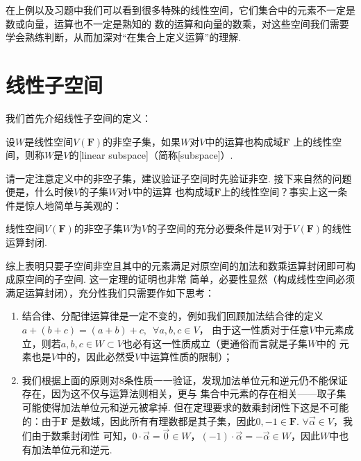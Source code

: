在上例以及习题中我们可以看到很多特殊的线性空间，它们集合中的元素不一定是数或向量，运算也不一定是熟知的
数的运算和向量的数乘，对这些空间我们需要学会熟练判断，从而加深对``在集合上定义运算''的理解.

\section{线性子空间}
我们首先介绍线性子空间的定义：
\begin{definition}
    设$W$是线性空间$V(\mathbf{F})$的非空子集，如果$W$对$V$中的运算也构成域$\mathbf{F}$
    上的线性空间，则称$W$是$V$的[linear subspace]（简称[subspace]）.
\end{definition}

请一定注意定义中的非空子集，建议验证子空间时先验证非空. 接下来自然的问题便是，什么时候$V$的子集$W$对$V$中的运算
也构成域$\mathbf{F}$上的线性空间？事实上这一条件是惊人地简单与美观的：
\begin{theorem}\label{thm:2:子空间判别}
    线性空间$V(\mathbf{F})$的非空子集$W$为$V$的子空间的充分必要条件是$W$对于$V(\mathbf{F})$的线性运算封闭.
\end{theorem}

综上表明只要子空间非空且其中的元素满足对原空间的加法和数乘运算封闭即可构成原空间的子空间. 这一定理的证明也非常
简单，必要性显然（构成线性空间必须满足运算封闭），充分性我们只需要作如下思考：
\begin{enumerate}
    \item 结合律、分配律运算律是一定不变的，例如我们回顾加法结合律的定义$a+(b+c)=(a+b)+c,\enspace\forall a,b,c\in V$，
    由于这一性质对于任意$V$中元素成立，则若$a,b,c\in W\subset V$也必有这一性质成立（更通俗而言就是子集$W$中的
    元素也是$V$中的，因此必然受$V$中运算性质的限制）；
    \item 我们根据上面的原则对8条性质一一验证，发现加法单位元和逆元仍不能保证存在，因为这不仅与运算法则相关，更与
    集合中元素的存在相关——取子集可能使得加法单位元和逆元被拿掉. 但在定理要求的数乘封闭性下这是不可能的：由于$\mathbf{F}$
    是数域，因此所有有理数都是其子集，因此$0,-1\in\mathbf{F}$. $\forall \vec{\alpha}\in V$，我们由于数乘封闭性
    可知，$0\cdot\vec{\alpha}=\vec{0}\in W$，$(-1)\cdot\vec{\alpha}=-\vec{\alpha}\in W$，因此$W$中也有加法单位元和逆元.
\end{enumerate}

